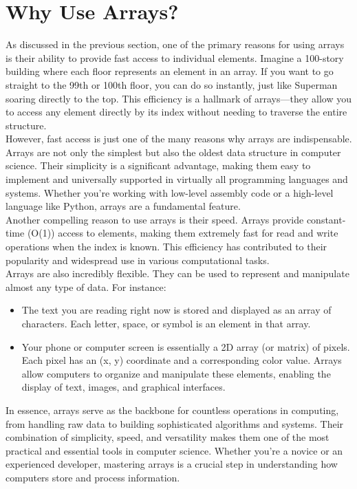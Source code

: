 \documentclass[12pt, oneside]{book}
\begin{document}
\section{Why Use Arrays?}
As discussed in the previous section, one of the primary reasons for using arrays is their ability to provide fast access to individual elements. Imagine a 100-story building where each floor represents an element in an array. If you want to go straight to the 99th or 100th floor, you can do so instantly, just like Superman soaring directly to the top. This efficiency is a hallmark of arrays—they allow you to access any element directly by its index without needing to traverse the entire structure.\\
However, fast access is just one of the many reasons why arrays are indispensable. Arrays are not only the simplest but also the oldest data structure in computer science. Their simplicity is a significant advantage, making them easy to implement and universally supported in virtually all programming languages and systems. Whether you're working with low-level assembly code or a high-level language like Python, arrays are a fundamental feature.\\
Another compelling reason to use arrays is their speed. Arrays provide constant-time (O(1)) access to elements, making them extremely fast for read and write operations when the index is known. This efficiency has contributed to their popularity and widespread use in various computational tasks.\\
Arrays are also incredibly flexible. They can be used to represent and manipulate almost any type of data. For instance:\\
\begin{itemize}
	\item The text you are reading right now is stored and displayed as an array of characters. Each letter, space, or symbol is an element in that array.
	\item Your phone or computer screen is essentially a 2D array (or matrix) of pixels. Each pixel has an (x, y) coordinate and a corresponding color value. Arrays allow computers to organize and manipulate these elements, enabling the display of text, images, and graphical interfaces.
\end{itemize}
In essence, arrays serve as the backbone for countless operations in computing, from handling raw data to building sophisticated algorithms and systems. Their combination of simplicity, speed, and versatility makes them one of the most practical and essential tools in computer science. Whether you're a novice or an experienced developer, mastering arrays is a crucial step in understanding how computers store and process information. 
\end{document}

